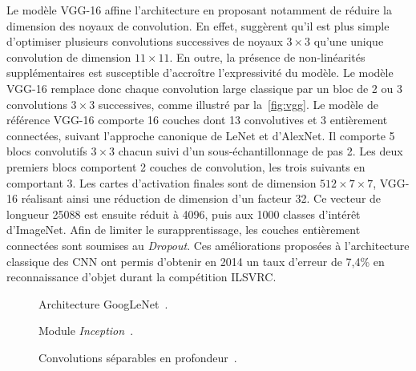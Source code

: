 Le modèle VGG-16 affine l'architecture en proposant notamment de réduire la dimension des noyaux de convolution. En effet, \citet{chatfield_return_2014,simonyan_very_2014} suggèrent qu'il est plus simple d'optimiser plusieurs convolutions successives de noyaux $3\times3$ qu'une unique convolution de dimension $11\times11$. En outre, la présence de non-linéarités supplémentaires est susceptible d'accroître l'expressivité du modèle. Le modèle VGG-16 remplace donc chaque convolution large classique par un bloc de 2 ou 3 convolutions $3\times3$ successives, comme illustré par la~\cref{fig:vgg}. Le modèle de référence VGG-16 comporte 16 couches dont 13 convolutives et 3 entièrement connectées, suivant l'approche canonique de LeNet et d'AlexNet. Il comporte 5 blocs convolutifs $3\times3$ chacun suivi d'un sous-échantillonnage de pas 2. Les deux premiers blocs comportent 2 couches de convolution, les trois suivants en comportant 3. Les cartes d'activation finales sont de dimension $512\times7\times7$, VGG-16 réalisant ainsi une réduction de dimension d'un facteur 32. Ce vecteur de longueur 25088 est ensuite réduit à 4096, puis aux 1000 classes d'intérêt d'ImageNet. Afin de limiter le surapprentissage, les couches entièrement connectées sont soumises au \emph{Dropout}. Ces améliorations proposées à l'architecture classique des \gls{CNN} ont permis d'obtenir en 2014 un taux d'erreur de 7,4\% en reconnaissance d'objet durant la compétition \gls{ILSVRC}.

\begin{figure}[t]
  \resizebox{\textwidth}{!}{
    
  }
  \caption[Architecture GoogLeNet.]{Architecture GoogLeNet~\cite{szegedy_going_2015}.}
  \label{fig:googlenet}
\end{figure}

\begin{figure}
  \begin{minipage}{0.48\textwidth}
    \resizebox{\textwidth}{!}{
      
    }
    \caption[Module \emph{Inception}.]{Module \emph{Inception}~\cite{szegedy_going_2015}.}
    \label{fig:inception}
  \end{minipage}
  \hfill
  \begin{minipage}{0.48\textwidth}
    \resizebox{\textwidth}{!}{
      
    }
    \caption[Convolutions séparables en profondeur.]{Convolutions séparables en profondeur~\cite{chollet_xception_2017}.}
    \label{fig:depthwise}
  \end{minipage}
\end{figure}

